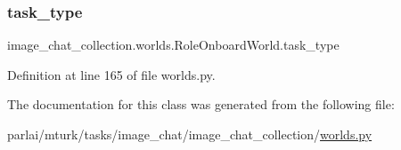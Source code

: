 \subsubsection{\texorpdfstring{task\+\_\+type}{task\_type}}
{\footnotesize\ttfamily image\+\_\+chat\+\_\+collection.\+worlds.\+Role\+Onboard\+World.\+task\+\_\+type}



Definition at line 165 of file worlds.\+py.



The documentation for this class was generated from the following file\+:\begin{DoxyCompactItemize}
\item 
parlai/mturk/tasks/image\+\_\+chat/image\+\_\+chat\+\_\+collection/\hyperlink{parlai_2mturk_2tasks_2image__chat_2image__chat__collection_2worlds_8py}{worlds.\+py}\end{DoxyCompactItemize}
